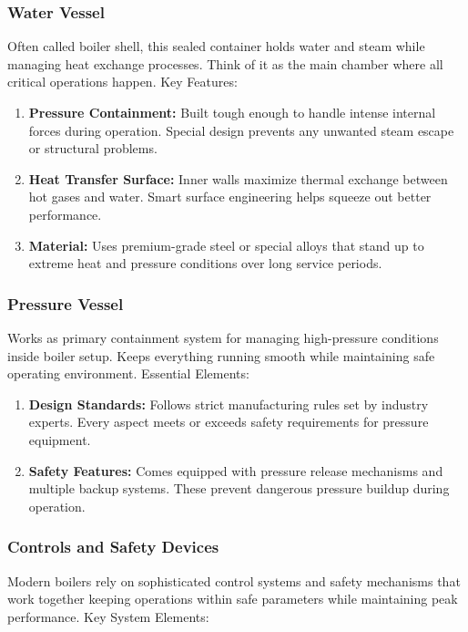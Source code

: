 \subsubsection{Water Vessel}
Often called boiler shell, this sealed container holds water and steam while managing heat exchange processes. Think of it as the main chamber where all critical operations happen.
Key Features:
\begin{enumerate}
    \item \textbf{Pressure Containment:} Built tough enough to handle intense internal forces during operation. Special design prevents any unwanted steam escape or structural problems.
    \item \textbf{Heat Transfer Surface:} Inner walls maximize thermal exchange between hot gases and water. Smart surface engineering helps squeeze out better performance.
    \item \textbf{Material:} Uses premium-grade steel or special alloys that stand up to extreme heat and pressure conditions over long service periods.
\end{enumerate}

\subsubsection{Pressure Vessel}
Works as primary containment system for managing high-pressure conditions inside boiler setup. Keeps everything running smooth while maintaining safe operating environment.
Essential Elements:
\begin{enumerate}
    \item \textbf{Design Standards:} Follows strict manufacturing rules set by industry experts. Every aspect meets or exceeds safety requirements for pressure equipment.
    \item \textbf{Safety Features:} Comes equipped with pressure release mechanisms and multiple backup systems. These prevent dangerous pressure buildup during operation.
\end{enumerate}

\subsubsection{Controls and Safety Devices}
Modern boilers rely on sophisticated control systems and safety mechanisms that work together keeping operations within safe parameters while maintaining peak performance.
Key System Elements:


